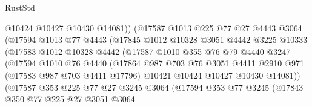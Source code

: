 \begin{lexlean}{RustStd}
\begin{coremodule}
                          @10424
                          @10427
                          @10430
                          @14081))
                      (@17587
                        @1013
                        @225
                        @77
                        @27
                        @4443
                        @3064
                        (@17594
                          @1013
                          @77
                          @4443
                          (@17845
                            @1012
                            @10328
                            @3051
                            @4442
                            @3225
                            @10333
                            (@17583
                              @1012
                              @10328
                              @4442
                              (@17587
                                @1010
                                @355
                                @76
                                @79
                                @4440
                                @3247
                                (@17594
                                  @1010
                                  @76
                                  @4440
                                  (@17864
                                    @987
                                    @703
                                    @76
                                    @3051
                                    @4411
                                    @2910
                                    @971
                                    (@17583 @987 @703 @4411 @17796)
                                    @10421
                                    @10424
                                    @10427
                                    @10430
                                    @14081))
                                (@17587
                                  @353
                                  @225
                                  @77
                                  @27
                                  @3245
                                  @3064
                                  (@17594
                                    @353
                                    @77
                                    @3245
                                    (@17843
                                      @350
                                      @77
                                      @225
                                      @27
                                      @3051
                                      @3064

\end{coremodule}
\end{lexlean}
